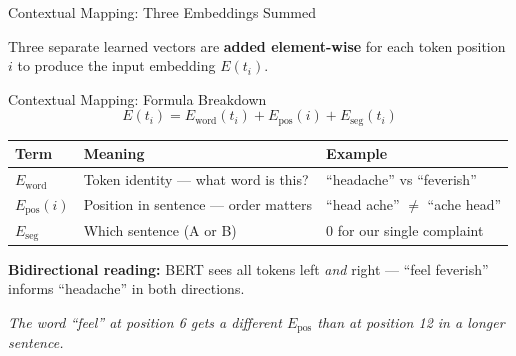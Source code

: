 \documentclass[10pt,aspectratio=169]{beamer}
\begin{document}
\begin{frame}{Contextual Mapping: Three Embeddings Summed}
	\begin{center}
	\end{center}
	\vspace{0.1cm}
	\small Three separate learned vectors are \textbf{added element-wise} for each token position $i$ to produce the input embedding $E(t_i)$.
\end{frame}

\begin{frame}{Contextual Mapping: Formula Breakdown}
	\small
	\[
		E(t_i) = E_{\mathrm{word}}(t_i) + E_{\mathrm{pos}}(i) + E_{\mathrm{seg}}(t_i)
	\]
	\begin{tabular}{@{}p{2.2cm}p{4.5cm}p{4.5cm}@{}}
		\toprule
		\textbf{Term} & \textbf{Meaning} & \textbf{Example} \\
		\midrule
		$E_{\mathrm{word}}$ & Token identity --- what word is this? & ``headache'' vs ``feverish'' \\
		$E_{\mathrm{pos}}(i)$ & Position in sentence --- order matters & ``head ache'' $\neq$ ``ache head'' \\
		$E_{\mathrm{seg}}$ & Which sentence (A or B) & 0 for our single complaint \\
		\bottomrule
	\end{tabular}

	\vspace{0.1cm}
	\textbf{Bidirectional reading:} BERT sees all tokens left \textit{and} right --- ``feel feverish'' informs ``headache'' in both directions.

	\footnotesize\textit{The word ``feel'' at position 6 gets a different $E_{\mathrm{pos}}$ than at position 12 in a longer sentence.}
\end{frame}
\end{document}
